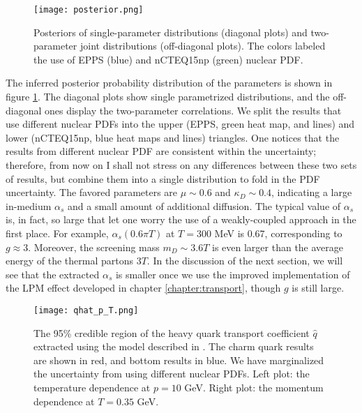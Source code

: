 \begin{figure}
\singlespacing
\centering
\texttt{[image: posterior.png]}
\caption[Posteriors of single-parameter distributions (diagonal plots) and]{Posteriors of single-parameter distributions (diagonal plots) and two-parameter joint distributions (off-diagonal plots). The colors labeled the use of EPPS (blue) and nCTEQ15np (green) nuclear PDF.}
\label{fig:LBT:posterior}
\end{figure}

The inferred posterior probability distribution of the parameters is shown in figure \ref{fig:LBT:posterior}.
The diagonal plots show single parametrized distributions, and the off-diagonal ones display the two-parameter correlations.
We split the results that use different nuclear PDFs into the upper (EPPS, green heat map, and lines) and lower (nCTEQ15np, blue heat maps and lines) triangles.
One notices that the results from different nuclear PDF are consistent within the uncertainty; therefore, from now on I shall not stress on any differences between these two sets of results, but combine them into a single distribution to fold in the PDF uncertainty.
The favored parameters are $\mu \sim 0.6$ and $\kappa_D \sim 0.4$, indicating a large in-medium $\alpha_s$ and a small amount of additional diffusion.
The typical value of $\alpha_s$ is, in fact, so large that let one worry the use of a weakly-coupled approach in the first place.
For example, $\alpha_s(0.6\pi T)$ at $T=300$ MeV is 0.67, corresponding to $g \approx 3$. 
Moreover, the screening mass $m_D \sim 3.6 T$ is even larger than the average energy of the thermal partons $3T$. 
In the discussion of the next section, we will see that the extracted $\alpha_s$ is smaller once we use the improved implementation of the LPM effect developed in chapter \ref{chapter:transport}, though $g$ is still large.

\begin{figure}
\singlespacing
\centering
\texttt{[image: qhat\_p\_T.png]}
\caption[The 95\% credible region of the heavy quark transport coefficient]{The 95\% credible region of the heavy quark transport coefficient $\hat{q}$ extracted using the model described in \cite{Ke:2018tsh}.
The charm quark results are shown in red, and bottom results in blue.
We have marginalized the uncertainty from using different nuclear PDFs.
Left plot: the temperature dependence at $p=10$ GeV. Right plot: the momentum dependence at $T=0.35$ GeV.
}\label{fig:LBT:posterior_qhat}
\end{figure}

